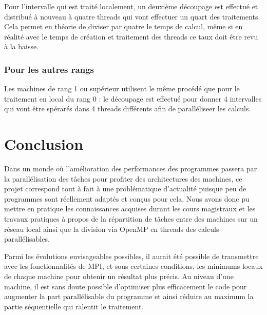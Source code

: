 			Pour l'intervalle qui est traité localement, un deuxième découpage est effectué et distribué à nouveau à quatre threads qui vont effectuer un quart des traitements. Cela permet en théorie de diviser par quatre le temps de calcul, même si en réalité avec le temps de création et traitement des threads ce taux doit être revu à la baisse. 
			
		\subsection{Pour les autres rangs}

			Les machines de rang 1 ou supérieur utilisent le même procédé que pour le traitement en local du rang 0 : le découpage est effectué pour donner 4 intervalles qui vont être spérarés dans 4 threads différents afin de paralléliseer les calculs.

\chapter*{Conclusion}
	Dans un monde où l'amélioration des performances des programmes passera par la parallélisation des tâches pour profiter des architectures des machines, ce projet correspond tout à fait à une problématique d'actualité puisque peu de programmes sont réellement adaptés et conçus pour cela. Nous avons donc pu mettre en pratique les connaissances acquises durant les cours magistraux et les travaux pratiques à propos de la répartition de tâches entre des machines sur un réseau local ainsi que la division via OpenMP en threads des calculs parallélisables.

	Parmi les évolutions envisageables possibles, il aurait été possible de transmettre avec les fonctionnalités de MPI, et sous certaines conditions, les minimums locaux de chaque machine pour obtenir un résultat plus précis. Au niveau d'une machine, il est sans doute possible d'optimiser plus efficacement le code pour augmenter la part parallélisable du programme et ainsi réduire au maximum la partie séquentielle qui ralentit le traitement.
